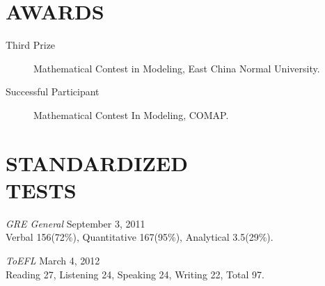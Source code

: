 \documentclass[margin]{res}
\begin{document}
\begin{resume}
		
		\section{AWARDS}
		\begin{description}
		  \item[Third Prize] Mathematical Contest in Modeling, East China Normal University.
		  \item[Successful Participant] Mathematical Contest In Modeling, COMAP.
		\end{description} 
		
		\section{STANDARDIZED \\TESTS} 
		{\sl GRE General} \hfill September 3, 2011 \\
		Verbal 156(72\%), Quantitative 167(95\%), Analytical 3.5(29\%).
		
		{\sl ToEFL}  \hfill March 4, 2012 \\
		Reading 27, Listening 24, Speaking 24, Writing 22, Total 97. 
		
		
	\end{resume}
\end{document}
